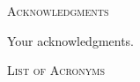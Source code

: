 \documentclass{UIdahoMastersThesis}
\begin{document}
\newpage


 \begin{center}
 	{\LARGE\textsc{Acknowledgments}}
 \end{center}
 
Your acknowledgments.

\newpage


   
   


\tableofcontents
\newpage




\listoffigures
\newpage





\begin{center}
	{\LARGE\textsc{List of Acronyms}}
\end{center}
\end{document}
